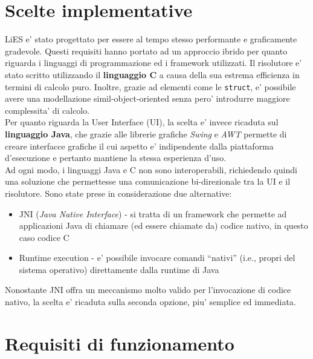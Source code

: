 \documentclass[10pt, a4paper]{article}
\begin{document}
\section{Scelte implementative}
\label{sec:scelte_implementative}

LiES e' stato progettato per essere al tempo stesso performante e graficamente gradevole. Questi requisiti hanno portato ad un approccio ibrido per quanto riguarda i linguaggi di programmazione ed i framework utilizzati. Il risolutore e' stato scritto utilizzando il \textbf{linguaggio C} a causa della sua estrema efficienza in termini di calcolo puro. Inoltre, grazie ad elementi come le \verb+struct+, e' possibile avere una modellazione simil-object-oriented senza pero' introdurre maggiore complessita' di calcolo.\\

Per quanto riguarda la User Interface (UI), la scelta e' invece ricaduta sul \textbf{linguaggio Java}, che grazie alle librerie grafiche \textit{Swing} e \textit{AWT} permette di creare interfacce grafiche il cui aspetto e' indipendente dalla piattaforma d'esecuzione e pertanto mantiene la stessa esperienza d'uso.\\

Ad ogni modo, i linguaggi Java e C non sono interoperabili, richiedendo quindi una soluzione che permettesse una comunicazione bi-direzionale tra la UI e il risolutore. Sono state prese in considerazione due alternative:
\begin{itemize}
	\item JNI (\textit{Java Native Interface}) - si tratta di un framework che permette ad applicazioni Java di chiamare (ed essere chiamate da) codice nativo, in questo caso codice C
	\item Runtime execution - e' possibile invocare comandi ``nativi'' (i.e., propri del sistema operativo) direttamente dalla runtime di Java
\end{itemize}

Nonostante JNI offra un meccanismo molto valido per l'invocazione di codice nativo, la scelta e' ricaduta sulla seconda opzione, piu' semplice ed immediata.


\section{Requisiti di funzionamento}
\label{sec:requisiti_funzionamento}
\end{document}
